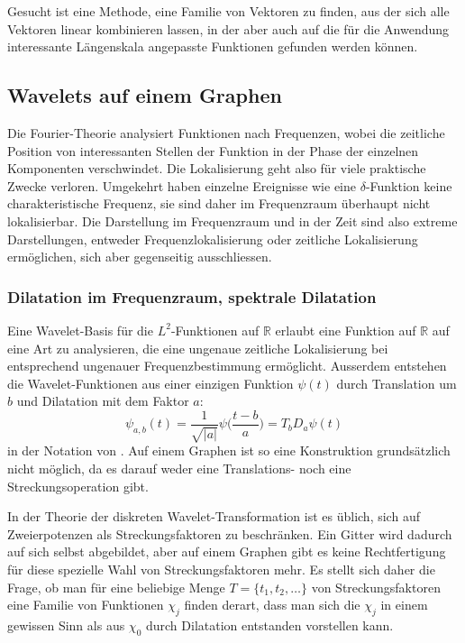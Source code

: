 Gesucht ist eine Methode, eine Familie von Vektoren zu finden,
aus der sich alle Vektoren linear kombinieren lassen, in der aber
auch auf die für die Anwendung interessante Längenskala angepasste
Funktionen gefunden werden können.

\subsection{Wavelets auf einem Graphen}
Die Fourier-Theorie analysiert Funktionen nach Frequenzen, wobei die 
zeitliche Position von interessanten Stellen der Funktion in der Phase
der einzelnen Komponenten verschwindet.
Die Lokalisierung geht also für viele praktische Zwecke verloren.
Umgekehrt haben einzelne Ereignisse wie eine $\delta$-Funktion keine
charakteristische Frequenz, sie sind daher im Frequenzraum überhaupt 
nicht lokalisierbar.
Die Darstellung im Frequenzraum und in der Zeit sind also extreme
Darstellungen, entweder Frequenzlokalisierung oder zeitliche Lokalisierung
ermöglichen, sich aber gegenseitig ausschliessen.

\subsubsection{Dilatation im Frequenzraum, spektrale Dilatation}
Eine Wavelet-Basis für die $L^2$-Funktionen auf $\mathbb{R}$ erlaubt
eine Funktion auf $\mathbb{R}$ auf eine Art zu analysieren, die eine
ungenaue zeitliche Lokalisierung bei entsprechend ungenauer
Frequenzbestimmung ermöglicht.
Ausserdem entstehen die Wavelet-Funktionen aus einer einzigen Funktion
$\psi(t)$ durch Translation um $b$ und Dilatation mit dem Faktor $a$:
\[
\psi_{a,b}(t)
=
\frac{1}{\sqrt{|a|}} \psi\biggl(\frac{t-b}a\biggr)
=
T_bD_a\psi(t)
\]
in der Notation von \cite{buch:mathsem-wavelets}.
Auf einem Graphen ist so eine Konstruktion grundsätzlich nicht möglich,
da es darauf weder eine Translations- noch eine Streckungsoperation gibt.

In der Theorie der diskreten Wavelet-Transformation ist es üblich, sich
auf Zweierpotenzen als Streckungsfaktoren zu beschränken.
Ein Gitter wird dadurch auf sich selbst abgebildet, aber auf einem
Graphen gibt es keine Rechtfertigung für diese spezielle Wahl von
Streckungsfaktoren mehr.
Es stellt sich daher die Frage, ob man für eine beliebige Menge
\(
T= \{ t_1,t_2,\dots\}
\)
von Streckungsfaktoren eine Familie von Funktionen $\chi_j$ finden
derart, dass man sich die $\chi_j$ in einem gewissen Sinn als aus
$\chi_0$ durch Dilatation entstanden vorstellen kann.

